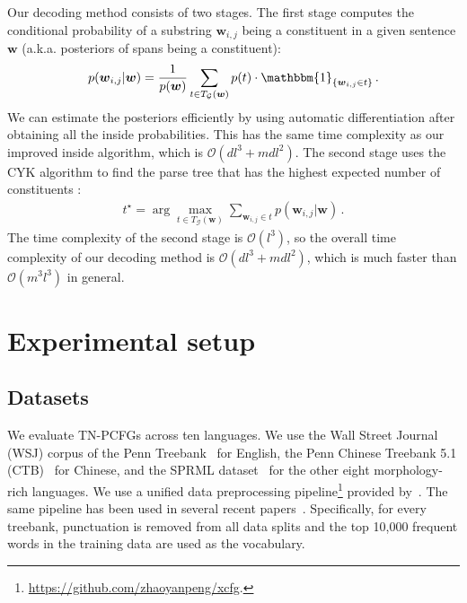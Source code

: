 \documentclass[11pt]{article}
\newcommand{\mbs}{\boldsymbol}
\begin{document}
Our decoding method consists of two stages.
The first stage computes the conditional probability of a substring $\mbs{w}_{i, j}$ being a constituent in a given sentence $\mbs{w}$ (a.k.a. posteriors of spans being a constituent):
\begin{align*}
p(\mbs{w}_{i, j} | \mbs{w}) = \frac{1}{p(\mbs{w})} \sum_{t\in T_{\mathcal{G}}(\mbs{w})} p(t)\cdot\mathbbm{1}_{\{ \mbs{w}_{i, j} \in t  \}}\,.
\end{align*}
We can estimate the posteriors efficiently by using automatic differentiation after obtaining all the inside probabilities. This has the same time complexity as our improved inside algorithm, which is $\mathcal{O}(dl^3+mdl^{2})$.
The second stage uses the CYK algorithm to find the parse tree that has the highest expected number of constituents \citep{DBLP:conf/acl/SmithE06a}:
\begin{align}
t^\star = \arg\max_{t\in T_{\mathcal{G}}(\mbs{w})} \sum_{\mbs{w}_{i, j} \in t } p(\mbs{w}_{i, j} | \mbs{w})\,.
\end{align}
The time complexity of the second stage is $\mathcal{O}(l^3)$, so the overall time complexity of our decoding method is $\mathcal{O}(dl^3+mdl^2)$, which is much faster than $\mathcal{O}(m^3l^3)$ in general.

\section{Experimental setup}
\subsection{Datasets}
We evaluate TN-PCFGs across ten languages.
We use the Wall Street Journal (WSJ) corpus of the Penn Treebank~\citep{marcus-etal-1994-penn} for English,
the Penn Chinese Treebank 5.1 (CTB)~\citep{xue_xia_chiou_palmer_2005} for Chinese,
and the SPRML dataset~\citep{seddah-etal-2014-introducing} for the other eight morphology-rich languages.
We use a unified data preprocessing pipeline\footnote{ \href{https://github.com/zhaoyanpeng/xcfg}{https://github.com/zhaoyanpeng/xcfg}.} provided by~\citet{zhao2020xcfg}. 
The same pipeline has been used in several recent papers~\citep{shen2018neural,shen2018ordered,kim-etal-2019-compound,zhao-titov-2020-visually}.
Specifically, for every treebank, punctuation is removed from all data splits
and the top 10,000 frequent words in the training data are used as the vocabulary.
\end{document}
